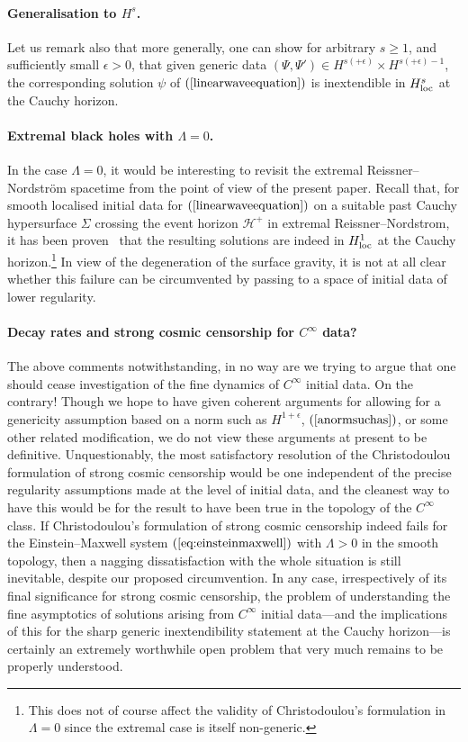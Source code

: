 \documentclass[A4,10pt]{article}
\begin{document}
\paragraph{Generalisation to $H^s$.}
Let us remark also that more generally, one can show for arbitrary $s\ge 1$,
and sufficiently small $\epsilon>0$, that given 
generic data $(\Psi,\Psi')\in H^{s(+\epsilon)}\times H^{s(+\epsilon)-1}$, the corresponding
solution $\psi$ of $(\ref{linearwaveequation})$
 is inextendible in
$H^s_{\rm loc}$ at the Cauchy horizon.

\paragraph{Extremal black holes with $\Lambda=0$.}
In the case $\Lambda=0$, it would be interesting to
revisit the  extremal
Reissner--Nordstr\"om spacetime from the point of view of the present paper.
Recall
that, for smooth localised initial data for $(\ref{linearwaveequation})$ on 
a suitable past Cauchy hypersurface $\Sigma$ 
crossing the event horizon $\mathcal{H}^+$
in extremal Reissner--Nordstrom,
it has been proven~\cite{Gajic:2015csa,Gajic:2015hyu,aag:2018extreme} that the resulting solutions
are indeed in $H^1_{\rm loc}$ at the Cauchy horizon.\footnote{This does not of course affect the validity of Christodoulou's formulation in $\Lambda=0$ since the extremal case is itself
non-generic.}
In view of the degeneration of the surface gravity,
it is not at all clear whether this failure can be circumvented by
 passing to a space of initial data of lower regularity.

 \paragraph{Decay rates and strong cosmic censorship for $C^\infty$ data?}
The above comments notwithstanding, in no way are we trying to argue that
one should cease investigation of the fine dynamics of  $C^\infty$ initial data. On the contrary!
Though we hope to have given
coherent  arguments for allowing for  a genericity assumption 
based on a norm such as $H^{1+\epsilon}$,  $(\ref{anormsuchas})$, or some other
related modification,
we do not view these arguments at present to be definitive. 
Unquestionably, 
the most
satisfactory resolution of the Christodoulou formulation of strong cosmic censorship would  be one independent
of the precise regularity assumptions made at the level of initial data, and the cleanest way to have this would be for the
result to have been true in the topology of the $C^\infty$ class.  If Christodoulou's
formulation of strong cosmic censorship indeed fails for the Einstein--Maxwell
system $(\ref{eq:einsteinmaxwell})$ with  $\Lambda>0$ in the smooth topology,
then a nagging dissatisfaction with the whole situation is still inevitable, despite
our proposed circumvention.
In any case, irrespectively of its final significance for strong cosmic censorship, the 
problem of understanding the fine asymptotics of solutions arising from $C^\infty$ initial 
data---and the implications of this for the sharp generic inextendibility statement at
the Cauchy horizon---is
certainly an extremely worthwhile open problem that very much remains to be properly  understood.


\end{document}

